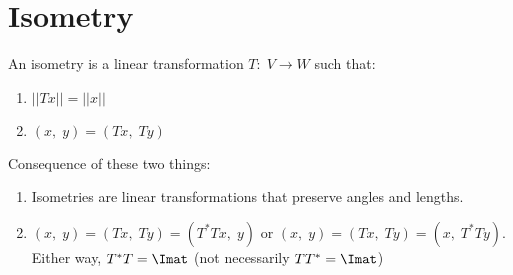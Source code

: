 \section*{Isometry}

An isometry is a linear transformation $T:\;V\rightarrow W$ such that:
\begin{enumerate}[label=(\roman*)]
    \item $||Tx||=||x||$
    \item $(x,\;y)=(Tx,\;Ty)$
\end{enumerate}

Consequence of these two things:
\begin{enumerate}[label=(\roman*)]
    \item Isometries are linear transformations that preserve angles and lengths.
    \item $(x,\;y)=(Tx,\;Ty)=(T^*Tx,\;y)$ or $(x,\;y)=(Tx,\;Ty)=(x,\;T^*Ty)$. Either way, $T^*T=\Imat$ (not necessarily $TT^*=\Imat$) 
\end{enumerate}